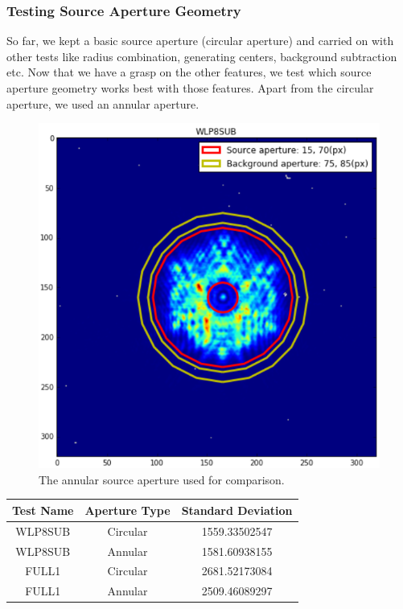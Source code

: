 \documentclass[conference]{IEEEtran}
\begin{document}
        
        \subsubsection{Testing Source Aperture Geometry}
        So far, we kept a basic source aperture (circular aperture) and carried on with other tests like radius combination, generating centers, background subtraction etc. Now that we have a grasp on the other features, we test which source aperture geometry works best with those features. Apart from the circular aperture, we used an annular aperture. 
        
        \begin{figure}[H]
            \includegraphics[scale=0.4]{Annular_source}
            \caption{The annular source aperture used for comparison.}
        \end{figure}
        
        \begin{center}
            \centering
            \label{tab:table 1}
            \begin{tabular}{|c c c|}
                \hline
                 Test Name & Aperture Type & Standard Deviation  \\
                 \hline
                 WLP8SUB & Circular & 1559.33502547 \\
                 WLP8SUB & Annular & 1581.60938155 \\
                 FULL1 & Circular & 2681.52173084 \\
                 FULL1 & Annular & 2509.46089297 \\
                 \hline
            \end{tabular}
            \caption{Comparing between circular \& annular aperture}
        \end{center}
     
\end{document}
